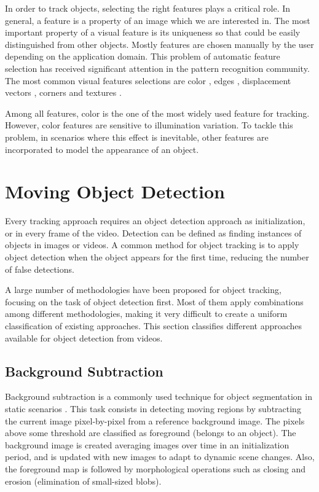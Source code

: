 In order to track objects, selecting the right features plays a critical role.
In general, a feature is a property of an image which we are interested in.
The most important property of a visual feature is its uniqueness so
that could be easily distinguished from other objects. Mostly features are
chosen manually by the user depending on the application domain. This problem of
automatic feature selection has received significant attention in the pattern
recognition community. The most common visual features selections are color
\cite{Paschos2001,Song1996}, edges \cite{Canny1986,Bowyer2001}, displacement
vectors \cite{Black1996,Lucas1981a}, corners \cite{Harris1988} and textures
\cite{Haralick1973,Nickels1997,Mallat1989}.

Among all features, color is the one of the most widely used feature for
tracking. However, color features are sensitive to illumination variation. To
tackle this problem, in scenarios where this effect is inevitable, other
features are incorporated to model the appearance of an object.

\section{Moving Object Detection} 
\label{sec::detection}

Every tracking approach requires an object detection approach as
initialization, or in every frame of the video. Detection can be defined as
finding instances of objects in images or videos. A common method for object
tracking is to apply object detection when the object appears for the first
time, reducing the number of false detections. 

A large number of methodologies have been proposed for object tracking, focusing
on the task of object detection first. Most of them apply combinations among
different methodologies, making it very difficult to create a uniform
classification of existing approaches. This section classifies
different approaches available for object detection from videos.

\subsection{Background Subtraction}

Background subtraction is a commonly used technique for object segmentation in
static scenarios \cite{McIvor2000}. This task consists in detecting moving
regions by subtracting the current image pixel-by-pixel from a reference
background image. The pixels above some threshold are classified as foreground
(belongs to an object). The background image is created averaging images over
time in an initialization period, and is updated with new images to adapt to
dynamic scene changes. Also, the foreground map is followed by morphological
operations such as closing and erosion (elimination of small-sized blobs).

